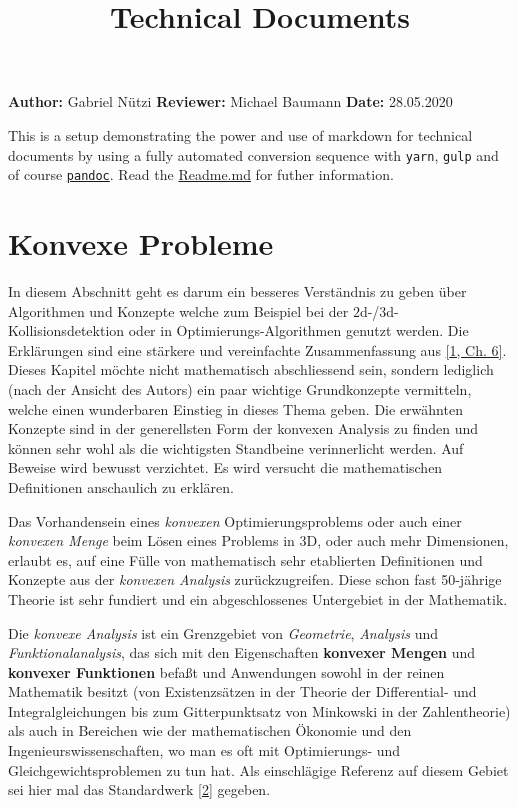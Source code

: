 \documentclass[
  12pt,
  british,
  a4paper,
  twoside,
  titlepage,
  openright,
  numbers=noenddot,
  chapterprefix=true,
  headings=optiontohead,
  svgnames,
  dvipsnames]{scrreprt}
\title{Technical Documents}
\author{}
\date{}
\begin{document}
% 
{
\hypersetup{linkcolor=Black}
\setcounter{tocdepth}{2}
\tableofcontents
}
\textbf{Author:} Gabriel Nützi \textbf{Reviewer:} Michael Baumann
\textbf{Date:} 28.05.2020

This is a setup demonstrating the power and use of markdown for
technical documents by using a fully automated conversion sequence with
\texttt{yarn}, \texttt{gulp} and of course
\href{www.pandoc.org}{\texttt{pandoc}}. Read the
\href{https://github.com/gabyx/TechnicalMarkdown/blob/master/Readme.md}{Readme.md}
for futher information.

\hypertarget{konvexe-probleme}{%
\chapter{Konvexe Probleme}\label{konvexe-probleme}}

In diesem Abschnitt geht es darum ein besseres Verständnis zu geben über
Algorithmen und Konzepte welche zum Beispiel bei der
\(2\)d-/\(3\)d-Kollisionsdetektion oder in Optimierungs-Algorithmen
genutzt werden. Die Erklärungen sind eine stärkere und vereinfachte
Zusammenfassung aus \protect\hyperlink{ref-nuetzig_thesis_2016}{{[}1,
Ch. 6{]}}. Dieses Kapitel möchte nicht mathematisch abschliessend sein,
sondern lediglich (nach der Ansicht des Autors) ein paar wichtige
Grundkonzepte vermitteln, welche einen wunderbaren Einstieg in dieses
Thema geben. Die erwähnten Konzepte sind in der generellsten Form der
konvexen Analysis zu finden und können sehr wohl als die wichtigsten
Standbeine verinnerlicht werden. Auf Beweise wird bewusst verzichtet. Es
wird versucht die mathematischen Definitionen anschaulich zu erklären.

Das Vorhandensein eines \emph{konvexen} Optimierungsproblems oder auch
einer \emph{konvexen Menge} beim Lösen eines Problems in \(3\)D, oder
auch mehr Dimensionen, erlaubt es, auf eine Fülle von mathematisch sehr
etablierten Definitionen und Konzepte aus der \emph{konvexen Analysis}
zurückzugreifen. Diese schon fast 50-jährige Theorie ist sehr fundiert
und ein abgeschlossenes Untergebiet in der Mathematik.

Die \emph{konvexe Analysis} ist ein Grenzgebiet von \emph{Geometrie},
\emph{Analysis} und \emph{Funktionalanalysis}, das sich mit den
Eigenschaften \textbf{konvexer Mengen} und \textbf{konvexer Funktionen}
befaßt und Anwendungen sowohl in der reinen Mathematik besitzt (von
Existenzsätzen in der Theorie der Differential- und Integralgleichungen
bis zum Gitterpunktsatz von Minkowski in der Zahlentheorie) als auch in
Bereichen wie der mathematischen Ökonomie und den
Ingenieurswissenschaften, wo man es oft mit Optimierungs- und
Gleichgewichtsproblemen zu tun hat. Als einschlägige Referenz auf diesem
Gebiet sei hier mal das Standardwerk
\protect\hyperlink{ref-rockafellar_convex_2015}{{[}2{]}} gegeben.
\end{document}
